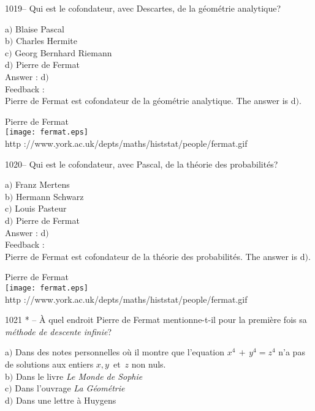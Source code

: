 ﻿\documentclass[letterpaper, 12pt]{article}
\begin{document}
1019-- Qui est le cofondateur, avec Descartes, de la g\'eom\'etrie
analytique?

a$)$ Blaise Pascal \\
b$)$ Charles Hermite \\
c$)$ Georg Bernhard Riemann \\
d$)$ Pierre de Fermat\\

Answer : d$)$\\

Feedback : \\
Pierre de Fermat est cofondateur de la g\'eom\'etrie analytique.
The answer is d$)$.\\

        \begin{center}
        Pierre de Fermat\\
    \texttt{[image: fermat.eps]}\\
        {\footnotesize http
://www.york.ac.uk/depts/maths/histstat/people/fermat.gif}
    \end{center}

1020-- Qui est le cofondateur, avec Pascal, de la th\'eorie des
probabilit\'es?

a$)$ Franz Mertens \\
b$)$ Hermann Schwarz \\
c$)$ Louis Pasteur \\
d$)$ Pierre de Fermat\\

Answer : d$)$\\

Feedback : \\
Pierre de Fermat est cofondateur de la th\'eorie des probabilit\'es.
The answer is d$)$.\\

        \begin{center}
        Pierre de Fermat\\
    \texttt{[image: fermat.eps]}\\
        {\footnotesize http
://www.york.ac.uk/depts/maths/histstat/people/fermat.gif}
    \end{center}

1021 * -- \`A quel endroit Pierre de Fermat mentionne-t-il pour la
premi\`ere fois sa {\sl m\'ethode de descente infinie}?

a$)$ Dans des notes personnelles o\`u il montre que l'equation
$x^4\,+\,y^4=z^4$ n'a pas de solutions
aux entiers $x,y\,$ et $\,z$ non nuls. \\
b$)$ Dans le livre {\sl Le Monde de Sophie} \\
c$)$ Dans l'ouvrage {\sl La G\'eom\'etrie} \\
d$)$ Dans une lettre \`a Huygens\\
\end{document}

